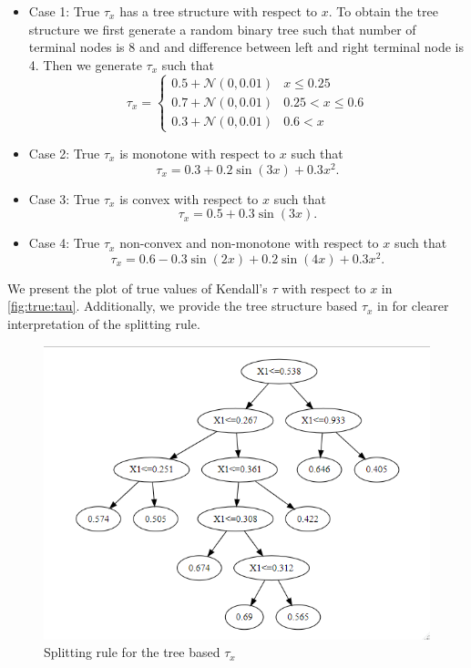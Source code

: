 \documentclass{amsart}
\begin{document}
\begin{itemize}
	\item Case 1: True $\tau_x$ has a tree structure with respect to $x$. To obtain the tree structure we first generate a random binary tree such that number of terminal nodes is 8 and and difference between left and right terminal node is 4. Then we generate $\tau_x$ such that
	\begin{equation}
		\tau_x = \begin{cases}
			0.5 + \mathcal{N}(0,0.01) & x \le 0.25\\
			0.7 + \mathcal{N}(0,0.01) & 0.25 < x \le 0.6\\
			0.3 + \mathcal{N}(0,0.01) & 0.6 < x
		\end{cases}
	\end{equation}
	\item Case 2: True $\tau_x$ is monotone with respect to $x$ such that 
	\begin{equation}\label{eq:synth:tau_x:case2}
		\tau_x = 0.3 + 0.2 \sin(3x) + 0.3x^2.
	\end{equation}
	\item Case 3: True $\tau_x$ is convex with respect to $x$ such that 
	\begin{equation}\label{eq:synth:tau_x:case3}
		\tau_x = 0.5 + 0.3 \sin(3x).
	\end{equation}
	\item Case 4: True $\tau_x$ non-convex and non-monotone with respect to $x$ such that 
	\begin{equation}\label{eq:synth:tau_x:case4}
		\tau_x = 0.6 - 0.3 \sin(2x) + 0.2 \sin(4x) + 0.3 x^2.
	\end{equation}
\end{itemize}

We present the plot of true values of Kendall's $\tau$ with respect to $x$ in \cref{fig:true:tau}. Additionally, we provide the tree structure based $\tau_x$ in for clearer interpretation of the splitting rule.

\begin{figure}
	\centering
	\caption{Splitting rule for the tree based $\tau_x$}
	\label{fig:tau_tree_split}
	\includegraphics[width=0.5\linewidth]{tree_cond_tau_x.png}
\end{figure}
\end{document}

